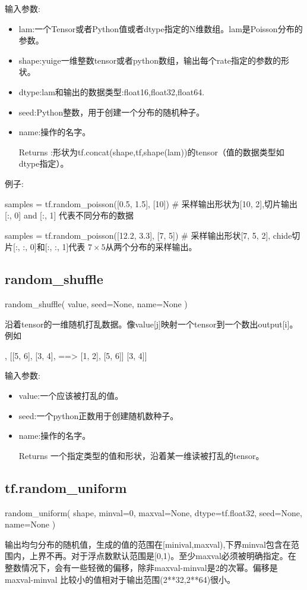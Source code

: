 输入参数:
\begin{itemize}
\item lam:一个Tensor或者Python值或者dtype指定的N维数组。lam是Poisson分布的参数。
\item shape:yuige一维整数tensor或者python数组，输出每个rate指定的参数的形状。
\item dtype:lam和输出的数据类型:float16,float32,float64.
\item seed:Python整数，用于创建一个分布的随机种子。
\item name:操作的名字。
\item[Returns]:形状为tf.concat(shape,tf,shape(lam))的tensor（值的数据类型如dtype指定）。
\end{itemize}
例子:
\begin{python}
samples = tf.random_poisson([0.5, 1.5], [10]) # 采样输出形状为[10, 2],切片输出 [:, 0] and [:, 1] 代表不同分布的数据

samples = tf.random_poisson([12.2, 3.3], [7, 5]) # 采样输出形状[7, 5, 2], chide切片[:, :, 0]和[:, :, 1]代表 $7\times5$从两个分布的采样输出。
\end{python}
\subsection{random\_shuffle}
\begin{python}
random_shuffle(
    value,
    seed=None,
    name=None
)
\end{python}
沿着tensor的一维随机打乱数据。像value[j]映射一个tensor到一个数出output[i]。例如
\begin{python}
[[1, 2],       [[5, 6],
 [3, 4],  ==>   [1, 2],
 [5, 6]]        [3, 4]]
\end{python}
输入参数:
\begin{itemize}
\item value:一个应该被打乱的值。
\item seed:一个python正数用于创建随机数种子。
\item name:操作的名字。
\item[Returns] 一个指定类型的值和形状，沿着某一维读被打乱的tensor。
\end{itemize}
\subsection{tf.random\_uniform}
\begin{python}
random_uniform(
    shape,
    minval=0,
    maxval=None,
    dtype=tf.float32,
    seed=None,
    name=None
)
\end{python}
输出均匀分布的随机值，生成的值的范围在[minival,maxval),下界minval包含在范围内，上界不再。对于浮点数默认范围是[0,1)。至少maxval必须被明确指定。在整数情况下，会有一些轻微的偏移，除非maxval-minval是2的次幂。偏移是maxval-minval
比较小的值相对于输出范围(2**32,2**64)很小。

